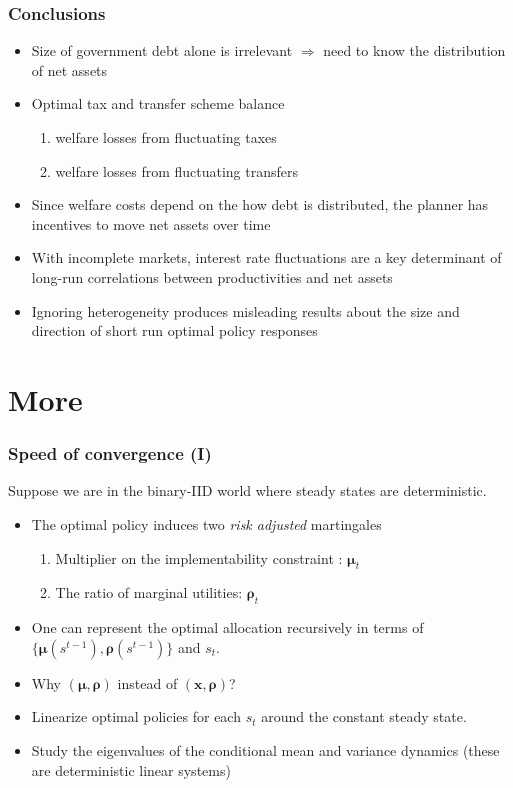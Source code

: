 \documentclass{beamer}
\begin{document}
\begin{frame}
 \frametitle{Conclusions}
\begin{itemize}
\item Size of government debt alone is irrelevant $\Longrightarrow $
need to know the  distribution of net assets
\item Optimal tax and transfer scheme balance
\begin{enumerate}
 \item welfare losses from fluctuating taxes
 \item welfare losses from fluctuating transfers
\end{enumerate}
\item Since welfare costs depend on the how debt is distributed, the planner has incentives to move  net assets over time
\item With incomplete markets, interest rate fluctuations are a  key determinant of  long-run correlations between productivities and net assets
\item Ignoring heterogeneity produces misleading results about the size and direction of short run optimal policy responses
\end{itemize}

\end{frame}
\appendix
\section{More}

\begin{frame}[label=convergence]
\frametitle{Speed of convergence  (I) }
Suppose we are in the binary-IID world where steady states are deterministic.


\begin{itemize}
\item The optimal policy induces two \emph{risk adjusted} martingales
\begin{enumerate}
\item Multiplier on the implementability constraint : $\bm{\mu}_{t}$
\item The ratio of marginal utilities: $\bm{\rho}_{t}$
\end{enumerate}
 \item One can represent the optimal allocation recursively in terms of $\{\bm \mu(s^{t-1}),\bm \rho(s^{t-1})\}$ and $s_t$.
\item Why $(\bm{\mu},\bm{\rho})$ instead of $(\bm{x},\bm{\rho})$?
\item Linearize optimal policies for each $s_t$ around the constant steady state.
\item Study the eigenvalues of the conditional mean and variance dynamics (these are deterministic linear systems)
\end{itemize}

\end{frame}
\end{document}

